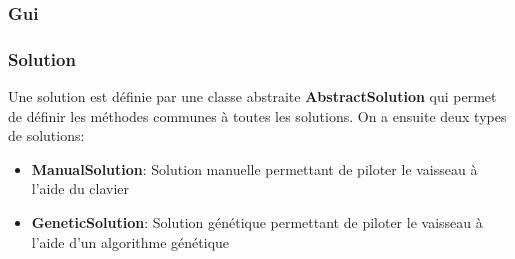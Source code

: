 \documentclass[french,a4paper,10pt,twocolumn]{article}
\begin{document}
\subsubsection{Gui}

\subsubsection{Solution}    

Une solution est définie par une classe abstraite \textbf{AbstractSolution} qui permet de définir les méthodes communes à toutes les solutions.
On a ensuite deux types de solutions:
\begin{itemize}
    \item \textbf{ManualSolution}: Solution manuelle permettant de piloter le vaisseau à l'aide du clavier
    \item \textbf{GeneticSolution}: Solution génétique permettant de piloter le vaisseau à l'aide d'un algorithme génétique
\end{itemize}



\pagebreak
\printbibliography
\end{document}
